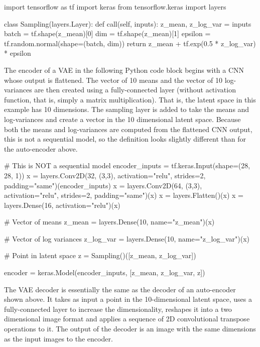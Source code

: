 \begin{pythoncode}
import tensorflow as tf
import keras
from tensorflow.keras import layers

class Sampling(layers.Layer):
    def call(self, inputs):
        z_mean, z_log_var = inputs
        batch = tf.shape(z_mean)[0]
        dim = tf.shape(z_mean)[1]
        epsilon = tf.random.normal(shape=(batch, dim))
        return z_mean + tf.exp(0.5 * z_log_var) * epsilon
\end{pythoncode}

The encoder of a VAE in the following Python code block begins with a CNN whose output is flattened. The vector of 10 means and the vector of 10 log-variances are then created using a fully-connected layer (without activation function, that is, simply a matrix multiplication). That is, the latent space in this example has 10 dimensions. The sampling layer is added to take the means and log-variances and create a vector in the 10 dimensional latent space. Because both the means and log-variances are computed from the flattened CNN output, this is not a sequential model, so the definition looks slightly different than for the auto-encoder above.

\begin{pythoncode}
# This is NOT a sequential model
encoder_inputs = tf.keras.Input(shape=(28, 28, 1))
x = layers.Conv2D(32, (3,3), activation="relu", 
             strides=2, padding="same")(encoder_inputs)
x = layers.Conv2D(64, (3,3), activation="relu", 
             strides=2, padding="same")(x)
x = layers.Flatten()(x)
x = layers.Dense(16, activation="relu")(x)

# Vector of means
z_mean = layers.Dense(10, name="z_mean")(x)

# Vector of log variances
z_log_var = layers.Dense(10, name="z_log_var")(x)

# Point in latent space
z = Sampling()([z_mean, z_log_var])

encoder = keras.Model(encoder_inputs, [z_mean, z_log_var, z])
\end{pythoncode}

The VAE decoder is essentially the same as the decoder of an auto-encoder shown above. It takes as input a point in the 10-dimensional latent space, uses a fully-connected layer to increase the dimensionality, reshapes it into a two dimensional image format and applies a sequence of 2D convolutional transpose operations to it. The output of the decoder is an image with the same dimensions as the input images to the encoder.

